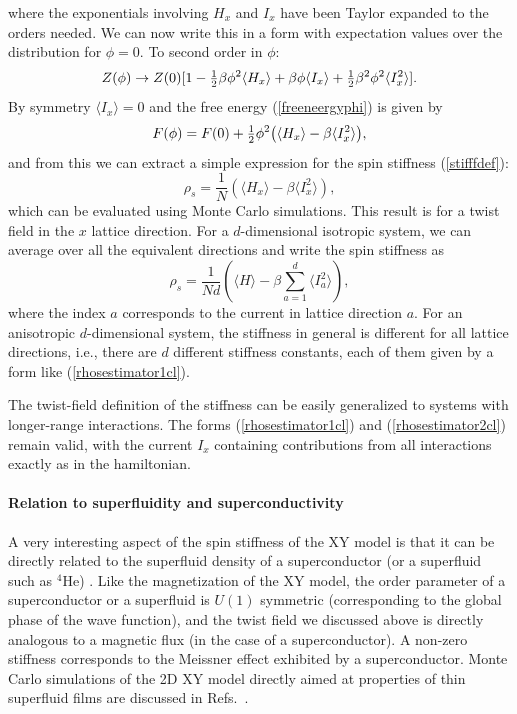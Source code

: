 \documentclass[draft,numberedheadings]{aipproc}
\newcommand{\half}{\hbox{$\frac{1}{2}$}}
\begin{document}
where the exponentials involving $H_x$ and $I_x$ have been Taylor expanded to the orders needed. We can now write this in a form with expectation values 
over the distribution for $\phi=0$. To second order in $\phi$:
\begin{equation}
Z(\phi) \to Z(0)[1  - \hbox{$\frac{1}{2}$}\beta\phi^2\langle H_x\rangle 
+ \beta \phi \langle I_x\rangle + \hbox{$\frac{1}{2}$}\beta^2\phi^2 \langle I_x^2\rangle].
\end{equation}
By symmetry $\langle I_x\rangle=0$ and the free energy (\ref{freeneergyphi}) is given by
\begin{equation}
F(\phi)=F(0)+ \half \phi^2 \bigl (\langle H_x\rangle -\beta\langle I_x^2\rangle \bigr ),
\end{equation}
and from this we can extract a simple expression for the spin stiffness (\ref{stifffdef}):
\begin{equation}
\rho_s=\frac{1}{N}( \langle H_x\rangle -\beta\langle I_x^2\rangle),
\label{rhosestimator1cl}
\end{equation}
which can be evaluated using Monte Carlo simulations. This result is for a twist field in the $x$ lattice direction. For a $d$-dimensional isotropic 
system, we can average over all the equivalent directions and write the spin stiffness as 
\begin{equation}
\rho_s=\frac{1}{Nd}\left ( \langle H\rangle -\beta \sum_{a=1}^d \langle I_a^2\rangle \right ),
\label{rhosestimator2cl}
\end{equation}
where the index $a$ corresponds to the current in lattice direction $a$. For an anisotropic $d$-dimensional system, the stiffness in general 
is different for all lattice directions, i.e., there are $d$ different stiffness constants, each of them given by a form  like 
(\ref{rhosestimator1cl}).

The twist-field definition of the stiffness can be easily generalized to systems with longer-range interactions. The forms (\ref{rhosestimator1cl})
and (\ref{rhosestimator2cl}) remain valid, with the current $I_x$ containing contributions from all interactions exactly as in the hamiltonian.

\paragraph{Relation to superfluidity and superconductivity}

A very interesting aspect of the spin stiffness of the XY model is that it can be directly related to the superfluid density of a superconductor
(or a superfluid such as $^4$He) \cite{fisher73,josephson66}. Like the magnetization of the XY model, the order parameter of a superconductor or a
superfluid is $U(1)$ symmetric (corresponding to the global phase of the wave function), and the twist field we discussed above is directly analogous 
to a magnetic flux (in the case of a superconductor). A non-zero stiffness corresponds to the Meissner effect exhibited by a superconductor. Monte 
Carlo simulations of the 2D XY model directly aimed at properties of thin superfluid films are discussed in Refs.~\cite{schultka94,schultka95}.
\end{document}
